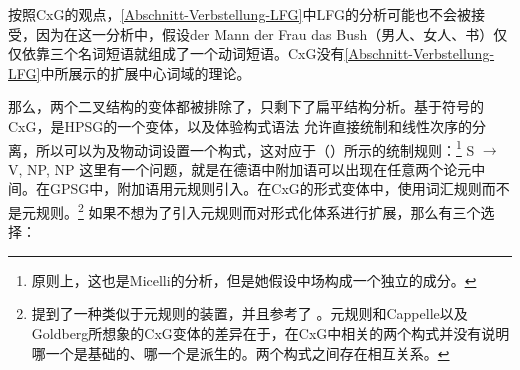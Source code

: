 按照CxG的观点，\ref{Abschnitt-Verbstellung-LFG}中LFG的分析可能也不会被接受，因为在这一分析中，假设der Mann der Frau das Bush（男人、女人、书）仅仅依靠三个名词短语就组成了一个动词短语。CxG没有\ref{Abschnitt-Verbstellung-LFG}中所展示的扩展中心词域的理论。

那么，两个二叉结构的变体都被排除了，只剩下了扁平结构分析。基于符号的CxG，是HPSG的一个变体\citep[]{Sag2010b}，以及体验构式语法 \citep[]{BC2005a}允许直接统制和线性次序的分离，所以可以为及物动词设置一个构式，这对应于（）所示的统制规则：\footnote{%
	原则上，这也是Micelli的分析，但是她假设中场构成一个独立的成分。%
}
\ea
S $\to$ V, NP, NP
\z
这里有一个问题，就是在德语中附加语可以出现在任意两个论元中间。在GPSG中，附加语用元规则引入。在CxG的形式变体中，使用词汇规则而不是元规则。\footnote{\label{fn-allostructions}%
   \citet[]{Goldberg2014a}提到了一种类似于元规则的装置，并且参考了 。元规则和Cappelle以及Goldberg所想象的CxG变体的差异在于，在CxG中相关的两个构式并没有说明哪一个是基础的、哪一个是派生的。两个构式之间存在相互关系。%
} 如果不想为了引入元规则而对形式化体系进行扩展，那么有三个选择：
